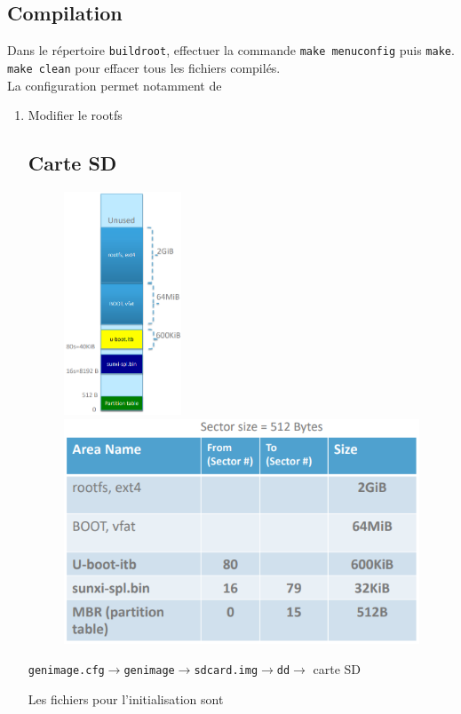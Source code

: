 \documentclass[resume]{subfiles}
\begin{document}
\subsection{Compilation}
Dans le répertoire \verb!buildroot!, effectuer la commande \verb!make menuconfig! puis \verb!make!. \verb!make clean! pour effacer tous les fichiers compilés.\\
La configuration permet notamment de 
\begin{enumerate}
\item Modifier le rootfs
\subsection{Carte SD}
\begin{figure}[H]
\centering
\includegraphics[width=3.50cm]{img_2.png}\\
\includegraphics[width=0.75\columnwidth]{img_3.png}
\end{figure}
\begin{center}
\verb!genimage.cfg!$\longrightarrow$\verb!genimage!$\longrightarrow$\verb!sdcard.img!$\longrightarrow$\verb!dd!$\longrightarrow$ carte SD
\end{center}
Les fichiers pour l'initialisation sont\\
\begin{table}[H]

\end{table}
\end{enumerate}
\end{document}
